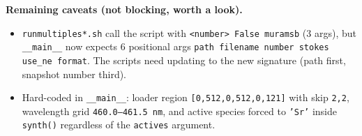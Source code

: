 \documentclass[11pt]{article}
\newcommand{\code}[1]{\texttt{\small #1}}
\begin{document}
\textbf{Remaining caveats (not blocking, worth a look).}
\begin{itemize}
\item \code{runmultiples*.sh} call the script with \code{<number> False muramsb} (3 args),
      but \code{\_\_main\_\_} now expects 6 positional args
      \code{path filename number stokes use\_ne format}. The scripts need updating to the
      new signature (path first, snapshot number third).
\item Hard-coded in \code{\_\_main\_\_}: loader region \code{[0,512,0,512,0,121]} with skip
      \code{2,2}, wavelength grid \code{460.0--461.5\,nm}, and active species forced to
      \code{'Sr'} inside \code{synth()} regardless of the \code{actives} argument.
\end{itemize}
\end{document}
